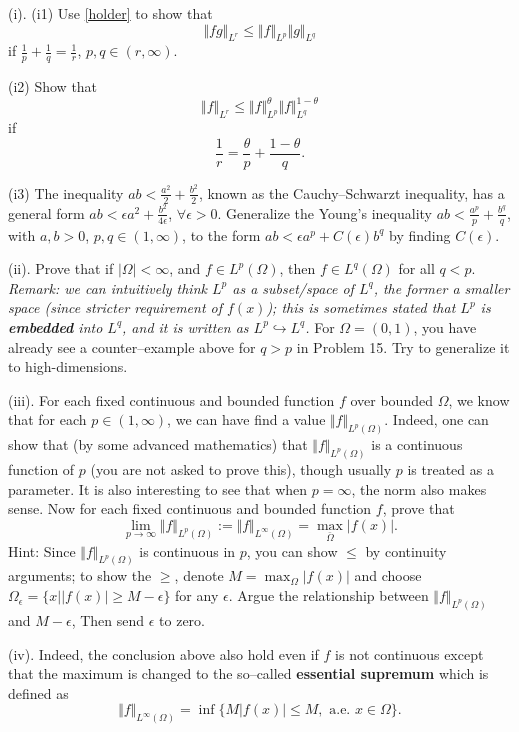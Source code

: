 \documentclass[6pt]{article}
\numberwithin{equation}{section}
\begin{document}
\begin{enumerate}
(i).  (i1) Use \eqref{holder} to show that \[\Vert fg \Vert_{L^r}\leq \Vert f\Vert_{L^p} \Vert g\Vert_{L^q}\]
if $\frac{1}{p}+\frac{1}{q}=\frac{1}{r}$, $p,q\in(r,\infty)$.

(i2)  Show that
\[\Vert f \Vert_{L^r}\leq \Vert f\Vert^\theta_{L^p} \Vert f\Vert^{1-\theta}_{L^q}\]
if
\[\frac{1}{r}=\frac{\theta}{p}+\frac{1-\theta}{q}.\]

(i3)  The inequality $ab<\frac{a^2}{2}+\frac{b^2}{2}$, known as the Cauchy--Schwarzt inequality, has a general form $ab<\epsilon a^2+\frac{b^2}{4\epsilon}$, $\forall \epsilon>0$.  Generalize the Young's inequality $ab<\frac{a^p}{p}+\frac{b^q}{q}$, with $a,b>0$, $p,q\in(1,\infty)$, to the form $ab<\epsilon a^p+C(\epsilon)b^q$ by finding $C(\epsilon)$.

(ii). Prove that if $\vert \Omega \vert<\infty$, and $f\in L^p(\Omega)$, then $f\in L^q(\Omega)$ for all $q<p$.  \emph{Remark:  we can intuitively think $L^p$ as a subset/space of $L^q$, the former a smaller space (since stricter requirement of $f(x)$); this is sometimes stated that $L^p$ is \textbf{embedded} into $L^q$, and it is written as $L^p\hookrightarrow L^q$.}  For $\Omega=(0,1)$, you have already see a counter--example above for $q>p$ in Problem 15.  Try to generalize it to high-dimensions.

(iii).  For each fixed continuous and bounded function $f$ over bounded $\Omega$, we know that for each $p\in(1,\infty)$, we can have find a value $\Vert f\Vert_{L^p(\Omega)}$.  Indeed, one can show that (by some advanced mathematics) that $\Vert f\Vert_{L^p(\Omega)}$ is a continuous function of $p$ (you are not asked to prove this), though usually $p$ is treated as a parameter.  It is also interesting to see that when $p=\infty$, the norm also makes sense.  Now for each fixed continuous and bounded function $f$, prove that
\[\lim_{p\rightarrow \infty}\Vert f\Vert_{L^p(\Omega)}:=\Vert f\Vert_{L^\infty(\Omega)}=\max_{\bar \Omega} \vert f(x)\vert.\]
Hint:  Since $\Vert f\Vert_{L^p(\Omega)}$ is continuous in $p$, you can show $\leq$ by continuity arguments; to show the $\geq$, denote $M=\max_{\Omega} \vert f(x)\vert$ and choose $\Omega_\epsilon=\{ x\vert \vert f(x)\vert\geq M-\epsilon \}$ for any $\epsilon$.  Argue the relationship between $\Vert f\Vert_{L^p(\Omega)}$ and $M-\epsilon$,  Then send $\epsilon$ to zero.

(iv).  Indeed, the conclusion above also hold even if $f$ is not continuous except that the maximum is changed to the so--called \textbf{essential supremum} which is defined as
\[\Vert f\Vert_{L^\infty(\Omega)}=\inf \{M|f(x)|\leq M, \text{~a.e.~} x \in \Omega \}.\]


\end{enumerate}
\end{document}
